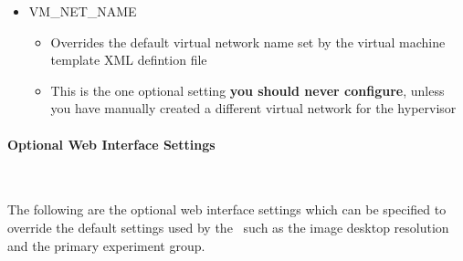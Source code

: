 \begin{itemize}
\item	VM\_NET\_NAME
		\begin{itemize}
		\item	Overrides the default virtual network name set by the virtual machine
				template XML defintion file
		\item	This is the one optional setting {\bf you should never configure}, unless you have
	  			manually created a different virtual network for the hypervisor
		\end{itemize}


\end{itemize}


\paragraph*{Optional Web Interface Settings}~\newline

The following are the optional web interface settings which can be specified to override
the default settings used by the \cernvmtestframework\, such as the \cernvm image desktop
resolution and the primary experiment group.

